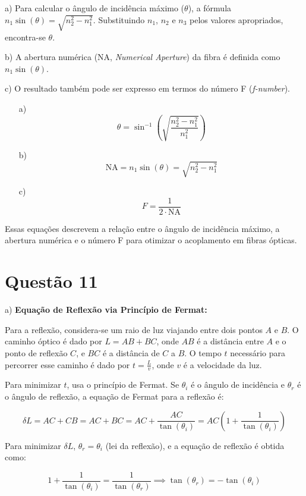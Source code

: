 \documentclass[a4paper, 12pt]{article}
\begin{document}
a) Para calcular o ângulo de incidência máximo (\(\theta\)), a fórmula \(n_1 \sin(\theta) = \sqrt{n_2^2 - n_1^2}\). Substituindo \(n_1\), \(n_2\) e \(n_3\) pelos valores apropriados, encontra-se  \(\theta\).

b) A abertura numérica (NA, \textit{Numerical Aperture}) da fibra é definida como \(n_1 \sin(\theta)\).

c) O resultado também pode ser expresso em termos do número F (\textit{f-number}).

\begin{enumerate}
    \item[a)]
    \[
    \theta = \sin^{-1}\left(\sqrt{\frac{n_2^2 - n_1^2}{n_1^2}}\right)
    \]
    
    \item[b)]
    \[
    \text{NA} = n_1 \sin(\theta) = \sqrt{n_2^2 - n_1^2}
    \]
    
    \item[c)]
    \[
    F = \frac{1}{2 \cdot \text{NA}}
    \]
\end{enumerate}

Essas equações descrevem a relação entre o ângulo de incidência máximo, a abertura numérica e o número F para otimizar o acoplamento em fibras ópticas.


\section*{Questão 11}

a) \textbf{Equação de Reflexão via Princípio de Fermat:}

Para a reflexão, considera-se um raio de luz viajando entre dois pontos \(A\) e \(B\). O caminho óptico é dado por \(L = AB + BC\), onde \(AB\) é a distância entre \(A\) e o ponto de reflexão \(C\), e \(BC\) é a distância de \(C\) a \(B\). O tempo \(t\) necessário para percorrer esse caminho é dado por \(t = \frac{L}{v}\), onde \(v\) é a velocidade da luz. 

Para minimizar \(t\), usa o princípio de Fermat. Se \(\theta_i\) é o ângulo de incidência e \(\theta_r\) é o ângulo de reflexão, a equação de Fermat para a reflexão é:

\[
\delta L = AC + CB = AC + BC = AC + \frac{AC}{\tan(\theta_i)} = AC \left(1 + \frac{1}{\tan(\theta_i)}\right)
\]

Para minimizar \(\delta L\), \(\theta_r = \theta_i\) (lei da reflexão), e a equação de reflexão é obtida como:

\[
1 + \frac{1}{\tan(\theta_i)} = \frac{1}{\tan(\theta_r)} \implies \tan(\theta_r) = -\tan(\theta_i)
\]
\end{document}
